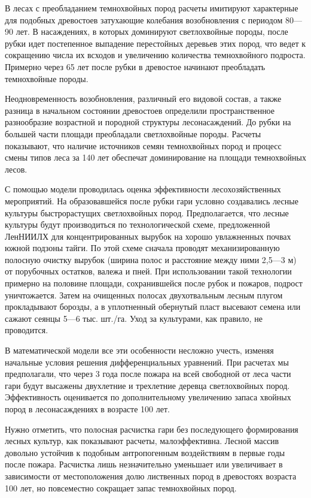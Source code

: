 \documentclass{report}
\begin{document}
В лесах с преобладанием темнохвойных пород расчеты имитируют характерные для подобных древостоев затухающие колебания
возобновления с периодом 80—90 лет. В насаждениях, в которых доминируют светлохвойные породы, после рубки идет
постепенное выпадение перестойных деревьев этих пород, что ведет к сокращению числа их всходов и увеличению количества
темнохвойного подроста. Примерно через 65 лет после рубки в древостое начинают преобладать темнохвойные породы.

Неодновременность возобновления, различный его видовой состав, а также разница в начальном состоянии древостоев
опре\-делили пространственное разнообразие возрастной и породной структуры лесонасаждений. До рубки на большей части
площади преобладали светлохвойные породы. Расчеты показывают, что наличие источников семян темнохвойных пород и процесс
смены типов леса за 140 лет обеспечат доминирование на площади темно\-хвойных лесов.

С помощью модели проводилась оценка эффективности лесохозяйственных мероприятий. На об\-разовавшейся после рубки гари
условно создавались лесные культуры быст\-рорастущих светлохвойных пород. Предполагается, что лесные культуры будут
производиться по технологической схеме, предложенной ЛенНИИЛХ для концентрированных вырубок на хо\-рошо увлажненных
почвах южной подзоны тайги. По этой схеме сначала проводят механизированную полосную очистку вырубок (ширина полос и
расстояние между ними 2,5—3 м) от порубочных остатков, валежа и пней. При ис\-пользовании такой технологии примерно на
половине площади, сохранившейся после рубок и пожаров, подрост уничтожается. Затем на очищенных полосах двухотвальным
лесным плугом про\-кладывают борозды, а в уплотненный обернутый пласт высевают семена или сажают сеянцы 5—6 тыс.
шт./га. Уход за культурами, как правило, не проводится.

В математической модели все эти особенности несложно учесть, изменяя начальные условия решения дифференциальных
урав\-нений. При расчетах мы предполагали, что через 3 года после по\-жара на всей свободной от леса части гари будут
высажены двух\-летние и трехлетние деревца светлохвойных пород. Эффективность оценивается по дополнительному увеличению
запаса хвойных пород в лесонасаждениях в возрасте 100 лет.

Нужно отметить, что полосная расчистка гари без последую\-щего формирования лесных культур, как показывают расчеты,
малоэффективна. Лесной массив довольно устойчив к подобным антропогенным воздействиям в первые годы после пожара.
Рас\-чистка лишь незначительно уменьшает или увеличивает в зависи\-мости от местоположения долю лиственных пород в
древостоях возраста 100 лет, но повсеместно сокращает запас темнохвойных пород.
\end{document}
